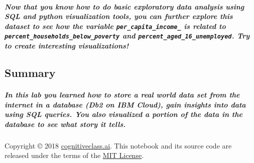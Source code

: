 \documentclass[11pt]{article}
\begin{document}
\hypertarget{now-that-you-know-how-to-do-basic-exploratory-data-analysis-using-sql-and-python-visualization-tools-you-can-further-explore-this-dataset-to-see-how-the-variable-per_capita_income_-is-related-to-percent_households_below_poverty-and-percent_aged_16_unemployed.-try-to-create-interesting-visualizations}{%
\subparagraph{\texorpdfstring{Now that you know how to do basic
exploratory data analysis using SQL and python visualization tools, you
can further explore this dataset to see how the variable
\texttt{per\_capita\_income\_} is related to
\texttt{percent\_households\_below\_poverty} and
\texttt{percent\_aged\_16\_unemployed}. Try to create interesting
visualizations!}{Now that you know how to do basic exploratory data analysis using SQL and python visualization tools, you can further explore this dataset to see how the variable per\_capita\_income\_ is related to percent\_households\_below\_poverty and percent\_aged\_16\_unemployed. Try to create interesting visualizations!}}\label{now-that-you-know-how-to-do-basic-exploratory-data-analysis-using-sql-and-python-visualization-tools-you-can-further-explore-this-dataset-to-see-how-the-variable-per_capita_income_-is-related-to-percent_households_below_poverty-and-percent_aged_16_unemployed.-try-to-create-interesting-visualizations}}

    \hypertarget{summary}{%
\subsection{Summary}\label{summary}}

\hypertarget{in-this-lab-you-learned-how-to-store-a-real-world-data-set-from-the-internet-in-a-database-db2-on-ibm-cloud-gain-insights-into-data-using-sql-queries.-you-also-visualized-a-portion-of-the-data-in-the-database-to-see-what-story-it-tells.}{%
\subparagraph{In this lab you learned how to store a real world data set
from the internet in a database (Db2 on IBM Cloud), gain insights into
data using SQL queries. You also visualized a portion of the data in the
database to see what story it
tells.}\label{in-this-lab-you-learned-how-to-store-a-real-world-data-set-from-the-internet-in-a-database-db2-on-ibm-cloud-gain-insights-into-data-using-sql-queries.-you-also-visualized-a-portion-of-the-data-in-the-database-to-see-what-story-it-tells.}}

    Copyright © 2018
\href{cognitiveclass.ai?utm_source=bducopyrightlink\&utm_medium=dswb\&utm_campaign=bdu}{cognitiveclass.ai}.
This notebook and its source code are released under the terms of the
\href{https://bigdatauniversity.com/mit-license/}{MIT License}.


    
    
    
\end{document}
